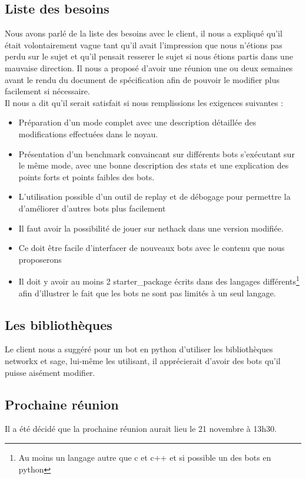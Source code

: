 \documentclass{article}
\begin{document}
\subsection*{Liste des besoins}
Nous avons parlé de la liste des besoins avec le client, il nous a expliqué qu'il était volontairement vague tant qu'il avait l'impression que nous n'étions pas perdu sur le sujet et qu'il pensait resserer le sujet si nous étions partis dans une mauvaise direction. Il nous a proposé d'avoir une réunion une ou deux semaines avant le rendu du document de spécification afin de pouvoir le modifier plus facilement si nécessaire.\\
Il nous a dit qu'il serait satisfait si nous remplissions les exigences suivantes :
\begin{itemize}
\item Préparation d'un mode complet avec une description détaillée des modifications effectuées dans le noyau.
\item Présentation d'un benchmark convaincant sur différents bots s'exécutant sur le même mode, avec une bonne description des stats et une explication des points forts et points faibles des bots.
\item L'utilisation possible d'un outil de replay et de débogage pour permettre la d'améliorer d'autres bots plus facilement
\item Il faut avoir la possibilité de jouer sur nethack dans une version modifiée.
\item Ce doit être facile d'interfacer de nouveaux bots avec le contenu que nous proposerons
\item Il doit y avoir au moins 2 starter\_package écrits dans des langages différents\footnote{Au moins un langage autre que c et c++ et si possible un des bots en python} afin d'illustrer le fait que les bots ne sont pas limités à un seul langage.
\end{itemize}

\subsection*{Les bibliothèques}
Le client nous a suggéré pour un bot en python d'utiliser les bibliothèques networkx et sage, lui-même les utilisant, il apprécierait d'avoir des bots qu'il puisse aisément modifier.

\subsection*{Prochaine réunion}
Il a été décidé que la prochaine réunion aurait lieu le 21 novembre à 13h30.
\end{document}
